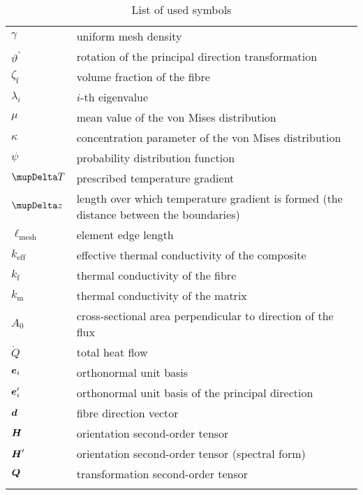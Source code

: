 \begin{table}[!h]
\centering
\caption{List of used symbols}\label{table:symbols5}
\begin{tabular}{>{\centering}p{}>{\small}p{}}
\toprule\noalign{\smallskip}
$\gamma$             & uniform mesh density\\
$\vartheta^\prime$   & rotation of the principal direction transformation\\
$\zeta_{\text{f}}$  & volume fraction of the fibre\\
$\lambda_i$        & $i$-th eigenvalue\\
$\mu$              & mean value of the von Mises distribution\\
$\kappa$           & concentration parameter of the von Mises distribution\\
$\psi$             & probability distribution function\\
$\mupDelta T$       & prescribed temperature gradient\\
$\mupDelta z$         & length over which temperature gradient is formed (the distance between the boundaries)\\
$\ell_\text{mesh}$                & element edge length\\
$k_{\text{eff}}$   & effective thermal conductivity of the composite\\
$k_{\text{f}}$     & thermal conductivity of the fibre\\
$k_{\text{m}}$     & thermal conductivity of the matrix\\
$A_0$              & cross-sectional area perpendicular to direction of the flux\\
$\dot{Q}$          & total heat flow\\
$\tena{e}_i$       & orthonormal unit basis\\
$\tena{e}_i^\prime$     & orthonormal unit basis of the principal direction\\
$\tena{d}$         & fibre direction vector\\
$\tenb{H}$         & orientation second-order tensor\\
$\tenb{H}^\prime $      & orientation second-order tensor (spectral form)\\
$\tenb{Q}$         & transformation second-order tensor\\
\noalign{\smallskip}\bottomrule\noalign{\smallskip}
\end{tabular}
\end{table}%

